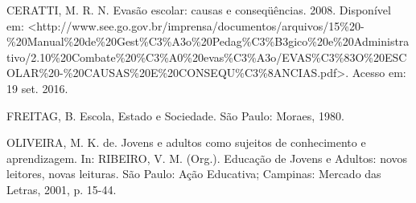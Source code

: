 \documentclass[article,12pt,onesidea,4paper,english,brazil]{abntex2}
\begin{document}
	\noindent CERATTI, M. R. N. Evasão escolar: causas e conseqüências. 2008. Disponível em:
	<http://www.see.go.gov.br/imprensa/documentos/arquivos/15\%20-
	\%20Manual\%20de\%20Gest\%C3\%A3o\%20Pedag\%C3\%B3gico\%20e\%20Administra tivo/2.10\%20Combate\%20\%C3\%A0\%20evas\%C3\%A3o/EVAS\%C3\%83O\%20ESC OLAR\%20-\%20CAUSAS\%20E\%20CONSEQU\%C3\%8ANCIAS.pdf>. Acesso em: 19
	set. 2016.
	
	\noindent FREITAG, B. Escola, Estado e Sociedade. São Paulo: Moraes, 1980.
	
	\noindent OLIVEIRA, M. K. de. Jovens e adultos como sujeitos de conhecimento e aprendizagem. In: RIBEIRO, V. M. (Org.). Educação de Jovens e Adultos: novos leitores, novas leituras. São Paulo: Ação Educativa; Campinas: Mercado das Letras, 2001, p. 15-44.
	
\end{document}
